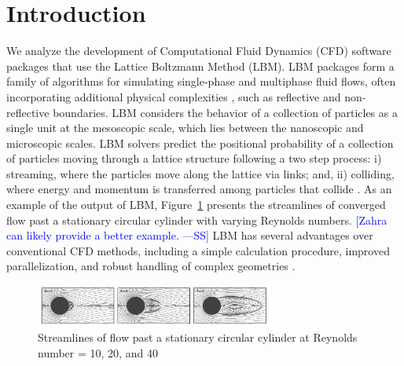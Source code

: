 \documentclass[final, 3p, times, authoryear]{elsarticle}
\newcommand{\authornote}[3]{\textcolor{#1}{[#3 ---#2]}}
\newcommand{\authornote}[3]{}
\newcommand{\wss}[1]{\authornote{blue}{SS}{#1}} %
\begin{document}

\section{Introduction} \label{secIntro}

We analyze the development of Computational Fluid Dynamics (CFD) software
packages that use the Lattice Boltzmann Method (LBM). LBM packages form a family
of algorithms for simulating single-phase and multiphase fluid flows, often
incorporating additional physical complexities \citep{chen1998lattice}, such as
reflective and non-reflective boundaries. LBM considers the behavior of a
collection of particles as a single unit at the mesoscopic scale, which lies
between the nanoscopic and microscopic scales. LBM solvers predict the
positional probability of a collection of particles moving through a lattice
structure following a two step process: i) streaming, where the particles move
along the lattice via links; and, ii) colliding, where energy and momentum is
transferred among particles that collide \citep{bao2011lattice}. As an example
of the output of LBM, Figure~\ref{circularflow} presents the streamlines of
converged flow past a stationary circular cylinder with varying Reynolds
numbers. \wss{Zahra can likely provide a better example.}  LBM has several
advantages over conventional CFD methods, including a simple calculation
procedure, improved parallelization, and robust handling of complex geometries
\citep{ganji2015application}.

\begin{figure}[h!]
	\begin{center}
		\includegraphics[width=0.7\textwidth]{./figures/circularflow}
		\caption{Streamlines of flow past a stationary circular cylinder at
		Reynolds number = 10, 20, and 40 \citep{chen2021phase}}
		\label{circularflow}
	\end{center}
\end{figure}
\end{document}
